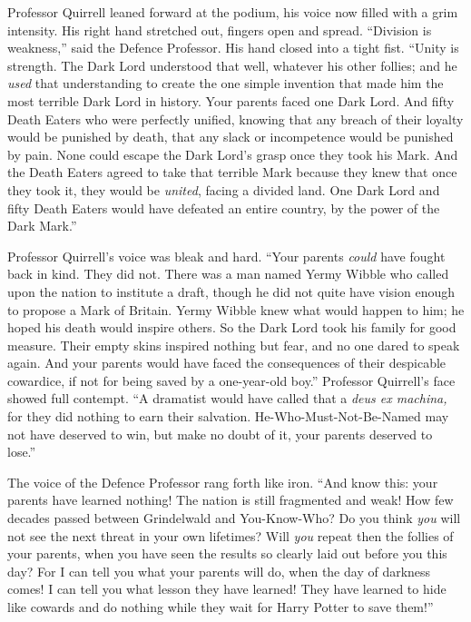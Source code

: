 Professor Quirrell leaned forward at the podium, his voice now filled with a grim intensity. His right hand stretched out, fingers open and spread. “Division is weakness,” said the Defence Professor. His hand closed into a tight fist. “Unity is strength. The Dark Lord understood that well, whatever his other follies; and he \emph{used} that understanding to create the one simple invention that made him the most terrible Dark Lord in history. Your parents faced one Dark Lord. And fifty Death Eaters who were perfectly unified, knowing that any breach of their loyalty would be punished by death, that any slack or incompetence would be punished by pain. None could escape the Dark Lord’s grasp once they took his Mark. And the Death Eaters agreed to take that terrible Mark because they knew that once they took it, they would be \emph{united}, facing a divided land. One Dark Lord and fifty Death Eaters would have defeated an entire country, by the power of the Dark Mark.”

Professor Quirrell’s voice was bleak and hard. “Your parents \emph{could} have fought back in kind. They did not. There was a man named Yermy Wibble who called upon the nation to institute a draft, though he did not quite have vision enough to propose a Mark of Britain. Yermy Wibble knew what would happen to him; he hoped his death would inspire others. So the Dark Lord took his family for good measure. Their empty skins inspired nothing but fear, and no one dared to speak again. And your parents would have faced the consequences of their despicable cowardice, if not for being saved by a one-year-old boy.” Professor Quirrell’s face showed full contempt. “A dramatist would have called that a \emph{deus ex machina,} for they did nothing to earn their salvation. He-Who-Must-Not-Be-Named may not have deserved to win, but make no doubt of it, your parents deserved to lose.”

The voice of the Defence Professor rang forth like iron. “And know this: your parents have learned nothing! The nation is still fragmented and weak! How few decades passed between Grindelwald and You-Know-Who? Do you think \emph{you} will not see the next threat in your own lifetimes? Will \emph{you} repeat then the follies of your parents, when you have seen the results so clearly laid out before you this day? For I can tell you what your parents will do, when the day of darkness comes! I can tell you what lesson they have learned! They have learned to hide like cowards and do nothing while they wait for Harry Potter to save them!”

